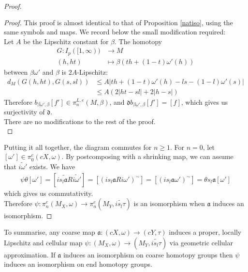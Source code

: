 \documentclass[a4paper,11pt]{article}
\theoremstyle{definition}
\theoremstyle{plain}
\theoremstyle{remark}
\begin{document}
{\begin{proof}
\begin{proof} This proof is almost identical to that of Proposition \ref{natiso}, using the same symbols and maps. We record below the small modification required: \\

Let $A$ be the Lipschitz constant for $\beta$. The homotopy 
\begin{align*}
G:I_{p}([1,\infty))&\rightarrow M\\
(h,ht)&\mapsto \beta(th + (1-t)\omega'(h))
\end{align*}
between $\beta \omega'$ and $\beta$ is $2A$-Lipschitz:
\begin{align*}
d_{M} (G(h,ht), G(s,sl)) &\leq A |th+(1-t)\omega'(h) - ls - (1-l)\omega'(s)|  \\
&\leq A(2|ht-sl| + 2|h-s|)
\end{align*}
Therefore $b_{\beta\omega',\beta}[f'] \in \pi_{n}^{L,e}(M,\beta)$, and $\mathfrak{d} b_{\beta\omega',\beta}[f'] = [f]$, which gives us surjectivity of $\mathfrak{d}$. \\

There are no modifications to the rest of the proof. \\
\end{proof}

Putting it all together, the diagram commutes for $n\geq 1$. For $n=0$, let $[\omega'] \in \pi_{0}^{c}(cX,\omega)$. By postcomposing with a shrinking map, we can assume that $\widetilde{i\omega'}$ exists. We have 
\begin{align*}
\psi\theta[\omega'] = [\widetilde{is_{l}\mathfrak{a}R}\widetilde{i\omega'}]= [(is_{l}\mathfrak{a}Ri\omega')^{\sim}] = [(is_{l}\mathfrak{a}\omega')^{\sim}] = \theta s_{l}\mathfrak{a} [\omega']
\end{align*}
which gives us commutativity. \\



Therefore $\psi: \pi_{n}^{e}(M_{X},\omega)\rightarrow \pi_{n}^{e}(M_{Y}, \widetilde{is_{l}\tau})$ is an isomorphism when $\mathfrak{a}$ induces an isomorphism. 
\end{proof}



To summarise, any coarse map $\mathfrak{a}: (cX,\omega)\rightarrow (cY,\tau)$ induces a proper, locally Lipschitz and cellular map $\psi: (M_{X},\omega)\rightarrow (M_{Y}, \widetilde{is_{l}\tau})$ via geometric cellular approximation. If $\mathfrak{a}$ induces an isomorphism on coarse homotopy groups then $\psi$ induces an isomorphism on end homotopy groups. \\

}
\end{document}
